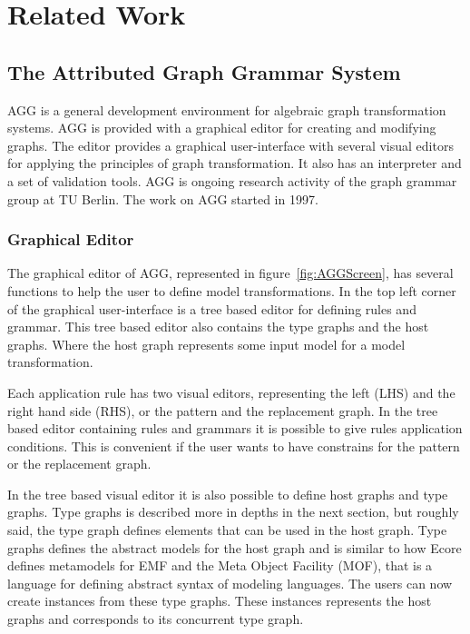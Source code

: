 
\chapter{Related Work} %

\label{Chapter5} %


\section{The Attributed Graph Grammar System}

AGG is a general development environment for algebraic graph
transformation systems. AGG is provided with a graphical editor for creating
and modifying graphs. The editor provides a graphical user-interface with
several visual editors for applying the principles of graph transformation. It
also has an interpreter and a set of validation tools. AGG is ongoing research
activity of the graph grammar group at TU Berlin. The work on AGG started in 1997.

\subsection{Graphical Editor}
The graphical editor of AGG, represented in
figure~\ref{fig:AGGScreen}, has several functions to help the user to define
model transformations. In the top left corner of the graphical user-interface
is a tree based editor for defining rules and grammar. This tree based editor
also contains the type graphs and the host graphs. Where the host graph
represents some input model for a model transformation.

Each application rule has two visual editors, representing the left
(LHS) and the right hand side (RHS), or the pattern and the replacement graph.
In the tree based editor containing rules and grammars it is possible to give
rules application conditions. This is convenient if the user wants to have
constrains for the pattern or the replacement graph.

In the tree based visual editor it is also possible to define host
graphs and type graphs. Type graphs is described more in depths in the next
section, but roughly said, the type graph defines elements that can be used in
the host graph. Type graphs defines the abstract models for the host graph and
is similar to how Ecore defines metamodels  for EMF and the Meta Object
Facility (MOF)\cite{MOF}, that is a language for defining abstract syntax of
modeling languages. The users can now create instances from these type graphs.
These instances represents the host graphs and corresponds to its concurrent
type graph.

